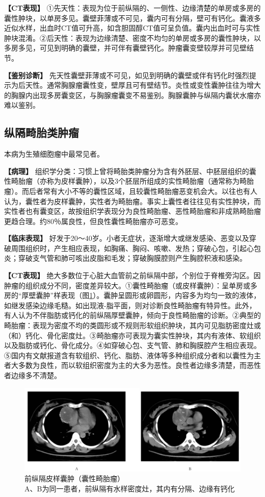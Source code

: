 \textbf{【CT表现】}
①先天性：表现为位于前纵隔的、一侧性、边缘清楚的单房或多房的囊性肿块，以单房多见。囊壁菲薄或不可见，囊内可有分隔，壁可有钙化。囊液多近似水样，出血时CT值可升高，如含胆固醇CT值可呈负值。囊内出血时可与实性肿块混淆。②后天性：表现为边缘清楚、密度不均匀的单房或多房的囊性肿块，以多房多见，可见到明确的囊壁，并可伴有囊壁钙化。肿瘤囊变壁较厚并可见壁结节。

\textbf{【鉴别诊断】}
先天性囊壁菲薄或不可见，如见到明确的囊壁或伴有钙化时强烈提示为后天性。通常胸腺瘤囊性变，壁厚且可有壁结节。炎性或变性囊肿往往为增大的胸腺内出现多房囊变区，与胸腺瘤囊变不易鉴别。胸腺囊肿与纵隔内囊状水瘤亦难以鉴别。

\subsection{纵隔畸胎类肿瘤}

本病为生殖细胞瘤中最常见者。

\textbf{【病理】}
组织学分类：习惯上曾将畸胎类肿瘤分为含有外胚层、中胚层组织的囊性畸胎瘤（亦称为皮样囊肿），以及3个胚层所组成的实性畸胎瘤（通常称为畸胎瘤）。而后者常有大小不等的囊性区域，且较囊性畸胎瘤恶变机会大。以往也有人认为，囊性者为皮样囊肿，实性者为畸胎瘤。事实上囊性者往往见有实性肿块，而实性者也有囊变区，故按组织学表现分为良性畸胎瘤、恶性畸胎瘤和非成熟畸胎瘤更趋合理。约80％属良性，但良性囊性畸胎瘤亦可恶变。

\textbf{【临床表现】}
好发于20～40岁。小者无症状，逐渐增大或继发感染、恶变以及穿破周围组织时，产生相应表现，如胸痛、胸闷、咳嗽、发热；穿破心包，引起心包炎；穿破支气管和肺可咳出皮脂和毛发；穿破胸膜腔则产生胸腔积液和感染。

\textbf{【CT表现】}
绝大多数位于心脏大血管前之前纵隔中部，个别位于脊椎旁沟区。因肿瘤的组织成分不同，密度差异较大。①囊性畸胎瘤（或皮样囊肿）：呈单房或多房的“厚壁囊肿”样表现（图\ref{fig9-54}）。囊肿呈圆形或卵圆形，内容多为均匀一致的液体，如继发感染边缘毛糙。如出现液-脂平面，则对诊断良性畸胎瘤有特异性。此外，有人认为不伴脂肪或钙化的前纵隔厚壁囊肿，倾向于良性畸胎瘤的诊断。②典型的畸胎瘤：表现为密度不均的类圆形或不规则形软组织肿块，其内可见脂肪密度灶或（和）钙化、骨化密度灶。③畸胎瘤亦可表现为囊实性肿块，其内有液体、软组织以及脂肪或钙化、骨化成分。④如穿破心包、支气管、肺和胸膜腔产生相应表现。⑤国内有文献报道含有软组织、钙化、脂肪、液体等多种组织成分者和以囊性为主者大多数为良性，而以软组织密度为主的大多为恶性。良性者边缘多清楚，而恶性者边缘多不清楚。

\begin{figure}[!htbp]
 \centering
 \includegraphics[width=.7\textwidth,height=\textheight,keepaspectratio]{./images/Image00257.jpg}
 \captionsetup{justification=centering}
 \caption{前纵隔皮样囊肿（囊性畸胎瘤）\\{\small A、B为同一患者，前纵隔有水样密度灶，其内有分隔、边缘有钙化}}
 \label{fig9-54}
  \end{figure} 

